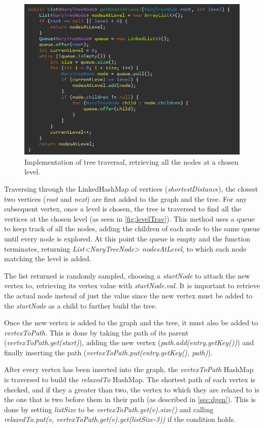 \documentclass{l4proj}
\begin{document}
\begin{figure}
    \centering
    \includegraphics[width=0.7\linewidth]{images/levelTrav.png}    

    \caption{Implementation of tree traversal, retrieving all the nodes at a chosen level.}
    \label{fig:levelTrav} 
\end{figure}

Traversing through the LinkedHashMap of vertices (\emph{shortestDistance}), the closest two vertices (\emph{root} and \emph{next}) are first added to the graph and the tree. For any subsequent vertex, once a level is chosen, the tree is traversed to find all the vertices at the chosen level (as seen in \autoref{fig:levelTrav}). This method uses a queue to keep track of all the nodes, adding the children of each node to the same queue until every node is explored. At this point the queue is empty and the function terminates, returning \emph{List<NaryTreeNode> nodesAtLevel}, to which each node matching the level is added.

The list returned is randomly sampled, choosing a \emph{startNode} to attach the new vertex to, retrieving its vertex value with \emph{startNode.val}. It is important to retrieve the actual node instead of just the value since the new vertex must be added to the \emph{startNode} as a child to further build the tree.

Once the new vertex is added to the graph and the tree, it must also be added to \emph{vertexToPath}. This is done by taking the path of its parent (\emph{vertexToPath.get(start)}), adding the new vertex (\emph{path.add(entry.getKey())}) and finally inserting the path (\emph{vertexToPath.put(entry.getKey(), path)}).

After every vertex has been inserted into the graph, the \emph{vertexToPath} HashMap is traversed to build the \emph{relaxedTo} HashMap. The shortest path of each vertex is checked, and if they a greater than two, the vertex to which they are relaxed to is the one that is two before them in their path (as described in \autoref{sec:dgen}). This is done by setting \emph{listSize} to be \emph{vertexToPath.get(v).size()} and calling \emph{relaxedTo.put(v, vertexToPath.get(v).get(listSize-3))} if the condition holds.
\end{document}
